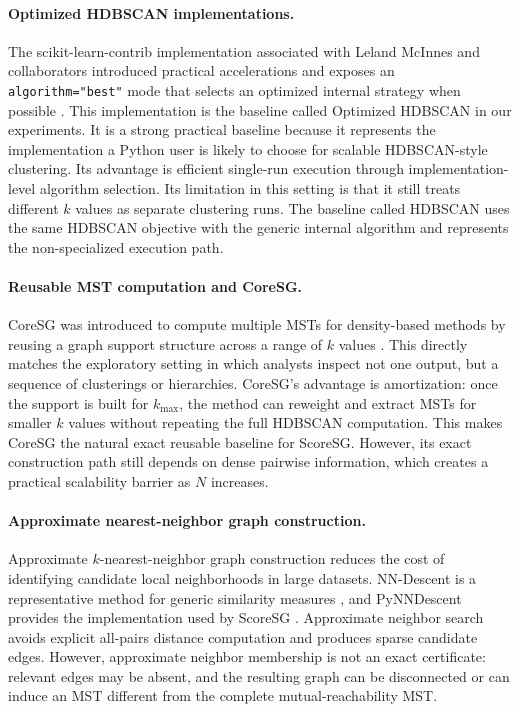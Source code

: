 \documentclass[11pt]{article}
\begin{document}
\paragraph{Optimized HDBSCAN implementations.}
The scikit-learn-contrib implementation associated with Leland McInnes and collaborators introduced practical accelerations and exposes an \texttt{algorithm="best"} mode that selects an optimized internal strategy when possible \citep{mcinnes2017accelerated,hdbscansoftware}. This implementation is the baseline called Optimized HDBSCAN in our experiments. It is a strong practical baseline because it represents the implementation a Python user is likely to choose for scalable HDBSCAN-style clustering. Its advantage is efficient single-run execution through implementation-level algorithm selection. Its limitation in this setting is that it still treats different \(k\) values as separate clustering runs. The baseline called HDBSCAN uses the same HDBSCAN objective with the generic internal algorithm and represents the non-specialized execution path.

\paragraph{Reusable MST computation and CoreSG.}
CoreSG was introduced to compute multiple MSTs for density-based methods by reusing a graph support structure across a range of \(k\) values \citep{araujo2022coresg}. This directly matches the exploratory setting in which analysts inspect not one output, but a sequence of clusterings or hierarchies. CoreSG's advantage is amortization: once the support is built for \(k_{\max}\), the method can reweight and extract MSTs for smaller \(k\) values without repeating the full HDBSCAN computation. This makes CoreSG the natural exact reusable baseline for ScoreSG. However, its exact construction path still depends on dense pairwise information, which creates a practical scalability barrier as \(N\) increases.

\paragraph{Approximate nearest-neighbor graph construction.}
Approximate \(k\)-nearest-neighbor graph construction reduces the cost of identifying candidate local neighborhoods in large datasets. NN-Descent is a representative method for generic similarity measures \citep{dong2011efficient}, and PyNNDescent provides the implementation used by ScoreSG \citep{pynndescentdocs}. Approximate neighbor search avoids explicit all-pairs distance computation and produces sparse candidate edges. However, approximate neighbor membership is not an exact certificate: relevant edges may be absent, and the resulting graph can be disconnected or can induce an MST different from the complete mutual-reachability MST.
\end{document}
